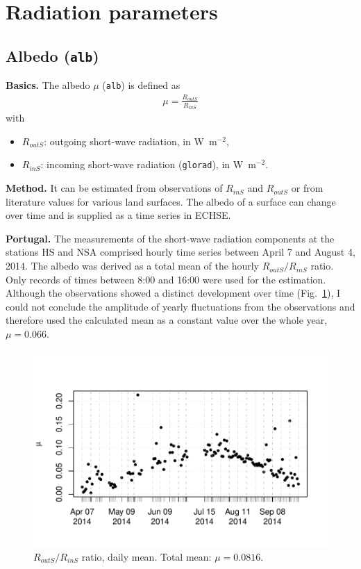 \documentclass{scrreprt}
\newenvironment{denseitem}{
  \begin{itemize}
    \setlength{\itemsep}{0pt}
    \setlength{\parskip}{0pt}
    \setlength{\parsep}{0pt}
}{
  \end{itemize}
}
\begin{document}
\section{Radiation parameters} \label{sec:parest_rad}

\subsection{Albedo (\texttt{alb})} \label{ssec:parest_rad_alb}

\textbf{Basics.}
The albedo $\mu$ (\verb!alb!) is defined as
\begin{align*}
  \mu = \frac{R_{outS}}{R_{inS}}
\end{align*}
%
with
\begin{denseitem}
  \item[] $R_{outS}$: outgoing short-wave radiation, in W~m$^{-2}$,
  \item[] $R_{inS}$: incoming short-wave radiation (\verb!glorad!), in W~m$^{-2}$.
\end{denseitem}

\textbf{Method.}
It can be estimated from observations of $R_{inS}$ and $R_{outS}$ or from literature values for various land surfaces.
The albedo of a surface can change over time and is supplied as a time series in ECHSE.

\textbf{Portugal.}
The measurements of the short-wave radiation components at the stations HS and NSA comprised hourly time series between April 7 and August 4, 2014.
The albedo was derived as a total mean of the hourly $R_{outS}/R_{inS}$ ratio.
Only records of times between 8:00 and 16:00 were used for the estimation.
Although the observations showed a distinct development over time (Fig.~\ref{fig:portugal_alb}), I could not conclude the amplitude of yearly fluctuations from the observations and therefore used the calculated mean as a constant value over the whole year, $\mu = 0.066$.

\begin{figure}[ht]
  \centering
  \includegraphics[width=0.6\hsize]{./plot_alb.pdf}
  \caption{$R_{outS}/R_{inS}$ ratio, daily mean. Total mean: $\mu = 0.0816$.}
  \label{fig:portugal_alb}
\end{figure}
\end{document}
